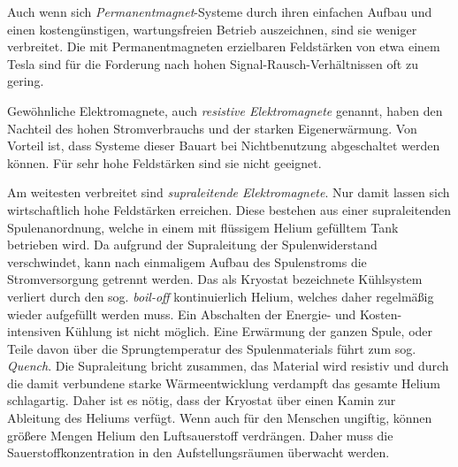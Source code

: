 Auch wenn sich \textit{Permanentmagnet}-Systeme durch ihren einfachen Aufbau und einen kostengünstigen, wartungsfreien Betrieb auszeichnen, sind sie weniger verbreitet. Die mit Permanentmagneten erzielbaren Feldstärken von etwa einem Tesla sind für die Forderung nach hohen Signal-Rausch-Verhältnissen oft zu gering.

Gewöhnliche Elektromagnete, auch \textit{resistive Elektromagnete} genannt, haben den Nachteil des hohen Stromverbrauchs und der starken Eigenerwärmung. Von Vorteil ist, dass Systeme dieser Bauart bei Nichtbenutzung abgeschaltet werden können. Für sehr hohe Feldstärken sind sie nicht geeignet.

Am weitesten verbreitet sind \textit{supraleitende Elektromagnete}. Nur damit lassen sich wirtschaftlich hohe Feldstärken erreichen. Diese bestehen aus einer supraleitenden Spulenanordnung, welche in einem mit flüssigem Helium gefülltem Tank betrieben wird. Da aufgrund der Supraleitung der Spulenwiderstand verschwindet, kann nach einmaligem Aufbau des Spulenstroms die Stromversorgung getrennt werden. Das als Kryostat bezeichnete Kühlsystem verliert durch den sog. \textit{boil-off} kontinuierlich Helium, welches daher regelmäßig wieder aufgefüllt werden muss. Ein Abschalten der Energie- und Kosten-intensiven Kühlung ist nicht möglich. Eine Erwärmung der ganzen Spule, oder Teile davon über die Sprungtemperatur des Spulenmaterials führt zum sog. \textit{Quench}. Die Supraleitung bricht zusammen, das Material wird resistiv und durch die damit verbundene starke Wärmeentwicklung verdampft das gesamte Helium schlagartig. Daher ist es nötig, dass der Kryostat über einen Kamin zur Ableitung des Heliums verfügt. Wenn auch für den Menschen ungiftig, können größere Mengen Helium den Luftsauerstoff verdrängen. Daher muss die Sauerstoffkonzentration in den Aufstellungsräumen überwacht werden.

